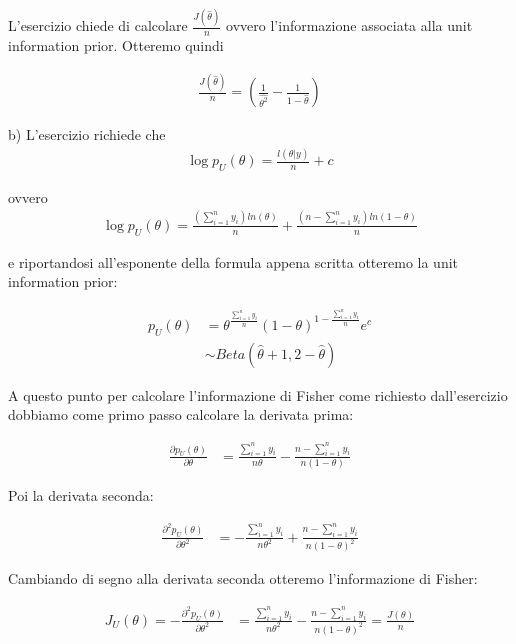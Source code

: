 L'esercizio chiede di calcolare $\frac{J(\hat{\theta})}{n}$ ovvero l'informazione associata alla unit information prior. Otteremo quindi

\begin{align*}
\frac{J(\hat{\theta})}{n} = \left(\frac{1}{\hat{\theta^2}} -
\frac{ 1 }{1- \hat{\theta}}\right)
\end{align*}

\bigskip
b) L'esercizio richiede che
\begin{align*}
\log p_U(\theta) = \frac{l(\theta|y)}{n}+c
\end{align*}

ovvero 
\begin{align*}
\log p_U(\theta)  = \frac{\left(\sum_{i=1}^n y_i\right)ln(\theta)}{n}+\frac{\left(n-\sum_{i=1}^n y_i\right)ln(1-\theta)}{n}
\end{align*}

e riportandosi all'esponente della formula appena scritta otteremo la unit information prior:

\begin{align*}
p_U(\theta)  &= \theta^\frac{\sum_{i=1}^n y_i}{n} 
(1-\theta)^{1-\frac{\sum_{i=1}^n y_i}{n}} 
e^c\\
&\sim Beta(\hat{\theta} + 1, 2 - \hat{\theta})
\end{align*}

A questo punto per calcolare l'informazione di Fisher come richiesto dall'esercizio dobbiamo come primo passo calcolare la derivata prima:

\begin{align*}
\frac{\partial p_U(\theta)}{\partial\theta} &= \frac{\sum_{i=1}^{n}y_i}{n\theta}-
\frac{n-\sum_{i=1}^{n}y_i}{n(1-\theta)}
\end{align*}

Poi la derivata seconda:

\begin{align*}
\frac{\partial^2 p_U(\theta)}{\partial\theta^2} &= -\frac{\sum_{i=1}^{n}y_i}{n\theta^2}+
\frac{n-\sum_{i=1}^{n}y_i}{n(1-\theta)^2}
\end{align*}

Cambiando di segno alla derivata seconda otteremo l'informazione di Fisher:

\begin{align*}
J_U(\theta) = -\frac{\partial^2 p_U(\theta)}{\partial\theta^2} &= \frac{\sum_{i=1}^{n}y_i}{n\theta^2} -
\frac{n-\sum_{i=1}^{n}y_i}{n(1-\theta)^2} = \frac{J(\theta)}{n}
\end{align*}


